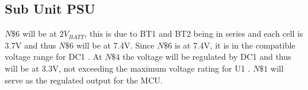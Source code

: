 \subsection{Sub Unit PSU}
$N\$6$ will be at $2V_{BATT}$, this is due to BT1 and BT2 being in series and each cell is 3.7\si{\V} \cite{ICR186502200F} and thus $N\$6$ will be at 7.4\si{\V}. Since $N\$6$ is at 7.4\si{\V}, it is in the compatible voltage range for DC1 \cite{BA033CC0FPE2}. At $N\$4$ the voltage will be regulated by DC1 and thus will be at 3.3\si{\V}, not exceeding the maximum voltage rating for U1 \cite{BA033CC0FPE2}. $N\$1$ will serve as the regulated output for the MCU.
